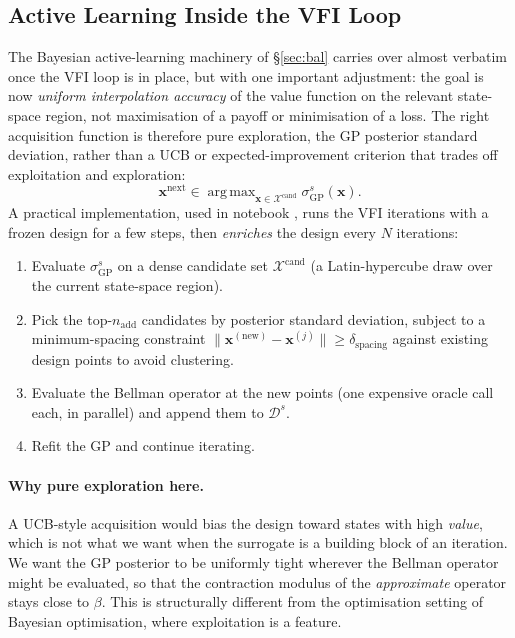 \documentclass[11pt,a4paper]{report}
\newcommand{\x}{\bm{x}}
\DeclareMathOperator*{\argmax}{arg\,max}
\begin{document}
\subsection{Active Learning Inside the VFI Loop}
\label{sec:gp_dp_bal_inside}

The Bayesian active-learning machinery of \S\ref{sec:bal} carries over almost verbatim once the VFI loop is in place, but with one important adjustment: the goal is now \emph{uniform interpolation accuracy} of the value function on the relevant state-space region, not maximisation of a payoff or minimisation of a loss.  The right acquisition function is therefore pure exploration, the GP posterior standard deviation, rather than a UCB or expected-improvement criterion that trades off exploitation and exploration:
\begin{equation}
\x^{\mathrm{next}} \in \argmax_{\x \in \mathcal{X}^\mathrm{cand}} \sigma_\mathrm{GP}^s(\x).
\label{eq:bal_vfi}
\end{equation}
A practical implementation, used in notebook , runs the VFI iterations with a frozen design for a few steps, then \emph{enriches} the design every $N$ iterations:

\begin{enumerate}[itemsep=2pt]
\item Evaluate $\sigma_\mathrm{GP}^s$ on a dense candidate set $\mathcal{X}^\mathrm{cand}$ (a Latin-hypercube draw over the current state-space region).
\item Pick the top-$n_\mathrm{add}$ candidates by posterior standard deviation, subject to a minimum-spacing constraint $\|\x^{(\mathrm{new})} - \x^{(j)}\| \ge \delta_\mathrm{spacing}$ against existing design points to avoid clustering.
\item Evaluate the Bellman operator at the new points (one expensive oracle call each, in parallel) and append them to $\mathcal{D}^s$.
\item Refit the GP and continue iterating.
\end{enumerate}

\paragraph{Why pure exploration here.}
A UCB-style acquisition would bias the design toward states with high \emph{value}, which is not what we want when the surrogate is a building block of an iteration.  We want the GP posterior to be uniformly tight wherever the Bellman operator might be evaluated, so that the contraction modulus of the \emph{approximate} operator stays close to $\beta$.  This is structurally different from the optimisation setting of Bayesian optimisation, where exploitation is a feature.
\end{document}
